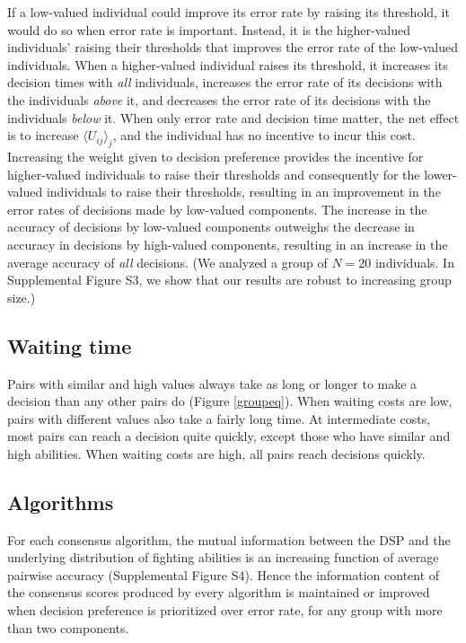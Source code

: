 \documentclass{pnastwo}
\begin{document}
\begin{article}
If a low-valued individual could improve its error rate by raising its threshold, it would do so when error rate is important.  Instead, it is the higher-valued individuals' raising their thresholds that improves the error rate of the low-valued individuals. When a higher-valued individual raises its threshold, it increases its decision times with \emph{all} individuals, increases the error rate of its decisions with the individuals \emph{above} it, and decreases the error rate of its decisions with the individuals \emph{below} it. When only error rate and decision time matter, the net effect is to increase $\langle U_{ij}\rangle _j$, and the individual has no incentive to incur this cost. Increasing the weight given to decision preference provides the incentive for higher-valued individuals to raise their thresholds and consequently for the lower-valued individuals to raise their thresholds, resulting in an improvement in the error rates of decisions made by low-valued components.  The increase in the accuracy of decisions by low-valued components outweighs the decrease in accuracy in decisions by high-valued components, resulting in an increase in the average accuracy of \emph{all} decisions. (We analyzed a group of $N=20$ individuals.  In Supplemental Figure S3, we show that our results are robust to increasing group size.)

\subsection{Waiting time }
Pairs with similar and high values always take as long or longer to make a decision than any other pairs do  (Figure \ref{groupeq}). When waiting costs are low, pairs with different values also take a fairly long time.  At intermediate costs, most pairs can reach a decision quite quickly, except those who have similar and high abilities.  When waiting costs are high, all pairs reach decisions quickly.   

\subsection{Algorithms}
For each consensus algorithm, the mutual information between the DSP and the underlying distribution of fighting abilities is an increasing function of average pairwise accuracy (Supplemental Figure S4). Hence the information content of the consensus scores produced by every algorithm is maintained or improved when decision preference is prioritized over error rate, for any group with more than two components. 


\end{article}
\end{document}
